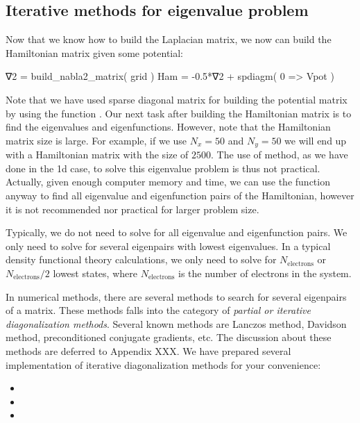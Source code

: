 \subsection{Iterative methods for eigenvalue problem}

Now that we know how to build the Laplacian matrix, we now can build the Hamiltonian
matrix given some potential:
\begin{juliacode}
∇2 = build_nabla2_matrix( grid )
Ham = -0.5*∇2 + spdiagm( 0 => Vpot )
\end{juliacode}
Note that we have used sparse diagonal matrix for building the potential matrix by
using the function .
Our next task after building the Hamiltonian matrix is to find the eigenvalues
and eigenfunctions.
However, note that the Hamiltonian matrix size is large.
For example, if we use $N_x=50$ and $N_y=50$ we will end up with a Hamiltonian
matrix with the size of $2500$.
The use of  method, as we have done in the 1d case,
to solve this eigenvalue problem is thus not practical.
Actually, given enough computer memory and time, we can use the function
 anyway to find all eigenvalue and eigenfunction pairs of
the Hamiltonian, however it is not recommended
nor practical for larger problem size.

Typically, we do not need to solve for all eigenvalue and eigenfunction pairs.
We only need to solve for several eigenpairs with lowest eigenvalues. In a typical density
functional theory calculations, we only need to solve for $N_{\mathrm{electrons}}$ or
$N_{\mathrm{electrons}}/2$ lowest states, where $N_{\mathrm{electrons}}$ is the number
of electrons in the system.

In numerical methods, there are several methods to search for several eigenpairs
of a matrix. These methods falls into the category of \textit{partial or iterative
diagonalization methods}. Several known methods are Lanczos method, Davidson method,
preconditioned conjugate gradients, etc.
The discussion about these methods are deferred to Appendix XXX.
We have prepared several implementation of iterative diagonalization methods
for your convenience:
\begin{itemize}
\item {}
\item {}
\item {}
\end{itemize}

